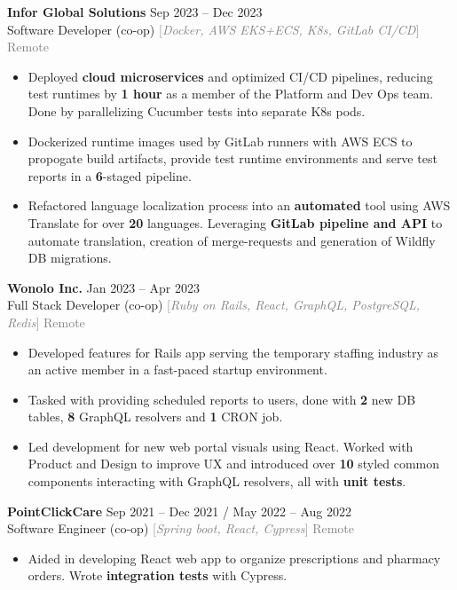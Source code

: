 \documentclass[9pt]{developercv} %
\begin{document}
\begin{minipage}[t]{\textwidth}
	\textbf{Infor Global Solutions} \hfill Sep 2023 -- Dec 2023 \\
	Software Developer (co-op) \quad \textcolor{gray}{[\;\textit{Docker, AWS EKS+ECS, K8s, GitLab CI/CD}\;]} \hfill \textcolor{gray}{Remote}
	\begin{itemize}[noitemsep,topsep=0pt]
		\item Deployed \textbf{cloud microservices} and optimized CI/CD pipelines,
		reducing test runtimes by \textbf{1 hour} as a member of the Platform and Dev Ops team.
		Done by parallelizing Cucumber tests into separate K8s pods.
		\item Dockerized runtime images used by GitLab runners with AWS ECS to propogate build artifacts, provide test runtime
		environments and serve test reports in a \textbf{6}-staged pipeline.
		\item Refactored language localization process into an \textbf{automated} tool using
		AWS Translate for over \textbf{20} languages. Leveraging \textbf{GitLab pipeline and API}
		to automate translation, creation of merge-requests and generation of Wildfly DB migrations.
	\end{itemize}
	\vspace{0.3em}

	\textbf{Wonolo Inc.} \hfill Jan 2023 -- Apr 2023 \\
	Full Stack Developer (co-op) \quad \textcolor{gray}{[\;\textit{Ruby on Rails, React, GraphQL, PostgreSQL, Redis}\;]} \hfill \textcolor{gray}{Remote}
	\begin{itemize}[noitemsep,topsep=0pt]
		\item Developed features for Rails app serving the temporary staffing industry as an active member in a fast-paced startup environment.
		\item Tasked with providing scheduled reports to users, done with \textbf{2} new DB tables, \textbf{8} GraphQL resolvers and \textbf{1} CRON job.
		\item Led development for new web portal visuals using React. Worked with Product and Design to improve UX and introduced over \textbf{10} styled common components interacting with GraphQL resolvers, all with \textbf{unit tests}.
	\end{itemize}
	\vspace{0.3em}

	\textbf{PointClickCare} \hfill Sep 2021 -- Dec 2021 / May 2022 -- Aug 2022 \\
	Software Engineer (co-op) \quad \textcolor{gray}{[\;\textit{Spring boot, React, Cypress}\;]} \hfill \textcolor{gray}{Remote}
	\begin{itemize}[noitemsep,topsep=0pt]
		\item Aided in developing React web app to organize prescriptions and pharmacy orders.
		Wrote \textbf{integration tests} with Cypress.
	\end{itemize}
	\vspace{0.3em}


\end{minipage}
\end{document}

